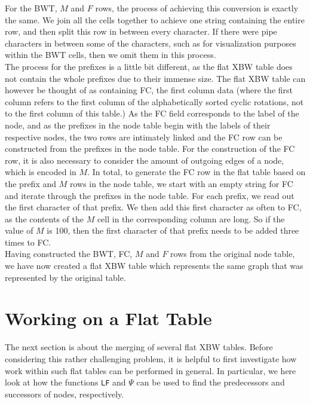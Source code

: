 \documentclass[a4paper,12pt,twoside,BCOR=10mm]{scrbook}
\begin{document}
For the BWT, $ M $ and $ F $ rows, the process of achieving this conversion is exactly the same.
We join all the cells together to achieve one string containing the entire
row, and then split this row in between every character.
If there were pipe characters in between some of the characters, such as
for visualization purposes within the BWT cells, then we omit them in this process. \\
The process for the prefixes is a little bit different, as the flat XBW table does
not contain the whole prefixes due to their immense size.
The flat XBW table can however be thought of as containing FC, the first column data (where
the first column refers to the first column of the alphabetically sorted cyclic rotations,
not to the first column of this table.)
As the FC field corresponds to the label of the node, and as the prefixes in the node table
begin with the labels of their respective nodes, the two rows are intimately linked
and the FC row can be constructed from the prefixes in the node table.
For the construction of the FC row, it is also necessary to consider the amount of
outgoing edges of a node, which is encoded in $ M $.
In total, to generate the FC row in the flat table based on the prefix and $ M $ rows in the
node table, we start with an empty string for FC and iterate through the prefixes in the node table.
For each prefix, we read out the first character of that prefix.
We then add this first character as often to FC, as the contents of the $ M $ cell
in the corresponding column are long. So if the value of $ M $ is 100,
then the first character of that prefix needs to be added three times to FC. \\
Having constructed the BWT, FC, $ M $ and $ F $ rows from the original node table,
we have now created a flat XBW table which represents the same graph that was represented
by the original table.

\section{Working on a Flat Table}
%

The next section is about the merging of several flat XBW tables.
Before considering this rather challenging problem,
it is helpful to first investigate how work within such flat tables can be performed in general.
In particular, we here look at how
the functions \texttt{LF} and $ \Psi $ can be used to find the predecessors and successors
of nodes, respectively.
\end{document}
